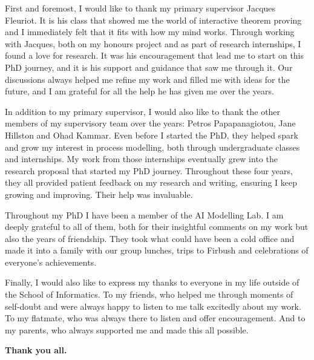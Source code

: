 First and foremost, I would like to thank my primary supervisor Jacques Fleuriot.
It is his class that showed me the world of interactive theorem proving and I immediately felt that it fits with how my mind works.
Through working with Jacques, both on my honours project and as part of research internships, I found a love for research.
It was his encouragement that lead me to start on this PhD journey, and it is his support and guidance that saw me through it.
Our discussions always helped me refine my work and filled me with ideas for the future, and I am grateful for all the help he has given me over the years.

In addition to my primary supervisor, I would also like to thank the other members of my supervisory team over the years: Petros Papapanagiotou, Jane Hillston and Ohad Kammar.
Even before I started the PhD, they helped spark and grow my interest in process modelling, both through undergraduate classes and internships.
My work from those internships eventually grew into the research proposal that started my PhD journey.
Throughout these four years, they all provided patient feedback on my research and writing, ensuring I keep growing and improving.
Their help was invaluable.

Throughout my PhD I have been a member of the AI Modelling Lab.
I am deeply grateful to all of them, both for their insightful comments on my work but also the years of friendship.
They took what could have been a cold office and made it into a family with our group lunches, trips to Firbush and celebrations of everyone's achievements.

Finally, I would also like to express my thanks to everyone in my life outside of the School of Informatics.
To my friends, who helped me through moments of self-doubt and were always happy to listen to me talk excitedly about my work.
To my flatmate, who was always there to listen and offer encouragement.
And to my parents, who always supported me and made this all possible.

\medskip
\begin{center}
  \bf
  Thank you all.
\end{center}
